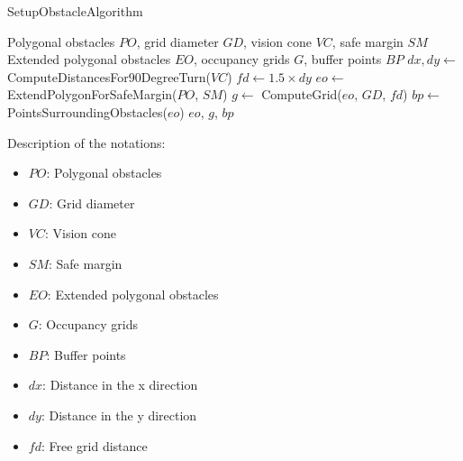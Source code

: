 \begin{algorithm}[H]
    \caption{SetupObstacleAlgorithm}
    \label{alg:setup_obstacle_algorithm}
    \begin{algorithmic}[1]
    \Require Polygonal obstacles $PO$, grid diameter $GD$, vision cone $VC$, safe margin $SM$
    \Ensure Extended polygonal obstacles $EO$, occupancy grids $G$, buffer points $BP$
    \State $dx, dy \leftarrow$ ComputeDistancesFor90DegreeTurn($VC$)
    \State $fd \leftarrow 1.5 \times dy$
    \State $eo \leftarrow$ ExtendPolygonForSafeMargin($PO$, $SM$)
    \State $g \leftarrow$ ComputeGrid($eo$, $GD$, $fd$)
    \State $bp \leftarrow$ PointsSurroundingObstacles($eo$)
    \State \Return $eo$, $g$, $bp$
    \end{algorithmic}
    \end{algorithm}
    
    Description of the notations:
    \begin{itemize}[noitemsep,topsep=0pt]
        \item $PO$: Polygonal obstacles
        \item $GD$: Grid diameter
        \item $VC$: Vision cone
        \item $SM$: Safe margin
        \item $EO$: Extended polygonal obstacles
        \item $G$: Occupancy grids
        \item $BP$: Buffer points
        \item $dx$: Distance in the x direction
        \item $dy$: Distance in the y direction
        \item $fd$: Free grid distance
    \end{itemize}

    



